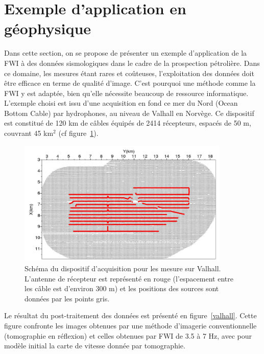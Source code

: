 \section{Exemple d'application en géophysique}

Dans cette section, on se propose de présenter un exemple d'application de la FWI à des données sismologiques dans le cadre de la prospection pétrolière. Dans ce domaine, les mesures étant rares et coûteuses, l'exploitation des données doit être efficace en terme de qualité d'image. C'est pourquoi une méthode comme la FWI y est adaptée, bien qu'elle nécessite beaucoup de ressource informatique.\\

L'exemple choisi est issu d'une acquisition en fond ce mer du Nord (Ocean Bottom Cable) par hydrophones, au niveau de Valhall en Norvège. Ce dispositif est constitué de 120 km de câbles équipés de 2414 récepteurs, espacés de 50 m, couvrant 45 km$^{2}$ (cf figure~\ref{dispositif_valhall}).

\begin{figure}[!h]
	\centering
	\includegraphics[height=6cm]{img/dispo_valhall.jpg}
	\caption{Schéma du dispositif d'acquisition pour les mesure sur Valhall. L'antenne de récepteur est représenté en rouge (l'espacement entre les câble est d'environ 300 m) et les positions des sources sont données par les points gris.\label{dispositif_valhall}}
\end{figure}

Le résultat du post-traitement des données  est présenté en figure~\ref{valhall}. Cette figure confronte les images obtenues par une méthode d'imagerie conventionnelle (tomographie en réflexion) et celles obtenues par FWI de 3.5 à 7 Hz, avec pour modèle initial la carte de vitesse donnée par tomographie.

